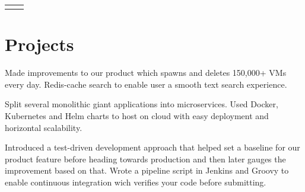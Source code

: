 \documentclass[10pt]{article} %
\begin{document}
\begin{paracol}{2}
\begin{supertabular}{rl}
	
	
	
	
	
	
	
	
	
	
	
\end{supertabular}


\section{Projects}




    {Made improvements to our product which spawns and deletes 150,000+ VMs every day.}
    {Redis-cache search to enable user a smooth text search experience.}

    {Split several monolithic giant applications into microservices.}
    {Used Docker, Kubernetes and Helm charts to host on cloud with easy deployment and horizontal scalability.}

{Introduced a test-driven development approach that helped set a baseline for our product feature before heading towards production and then later gauges the improvement based on that.}
{Wrote a pipeline script in Jenkins and Groovy to enable continuous integration wich verifies your code before submitting.}


\end{paracol}
\end{document}
